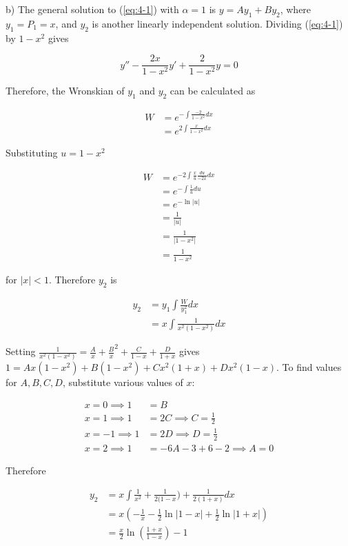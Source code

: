 \documentclass{article}
\begin{document}
\hfill\break
b) The general solution to (\ref{eq:4-1}) with $\alpha = 1$ is $y = Ay_1 + By_2$, where $y_1 = P_1 = x$, and $y_2$ is another linearly
independent solution. Dividing (\ref{eq:4-1}) by $1 - x^2$ gives

\begin{equation} \label{eq:4-3}
    y'' - \frac{2x}{1 - x^2}y' + \frac{2}{1 - x^2}y = 0
\end{equation}

Therefore, the Wronskian of $y_1$ and $y_2$ can be calculated as

\begin{align*}
    W &= e^{-\int \frac{-2}{1 - x^2} dx}\\
    &= e^{2\int \frac{x}{1 - x^2} dx}
\end{align*}

Substituting $u = 1 - x^2$

\begin{align*}
    W &= e^{-2 \int \frac{x}{u} \frac{du}{-2x} dx}\\
    &= e^{- \int \frac{1}{u} du}\\
    &= e^{-\ln|u|}\\
    &= \frac{1}{|u|}\\
    &= \frac{1}{|1 - x^2|}\\
    &= \frac{1}{1 - x^2}
\end{align*}

for $|x| < 1$. Therefore $y_2$ is

\begin{align*}
    y_2 &= y_1 \int \frac{W}{y_1^2}dx\\
    &= x \int \frac{1}{x^2(1 - x^2)} dx
\end{align*}

Setting $\frac{1}{x^2(1 - x^2)} = \frac{A}{x} + \frac{B}x^2 + \frac{C}{1 - x} + \frac{D}{1 + x}$ gives
$1 = Ax(1 - x^2) + B(1 - x^2) + Cx^2(1 + x) + Dx^2(1 - x)$. To find values for $A, B, C, D$, substitute various values of $x$:

\begin{align*}
    x = 0 \implies 1 &= B\\
    x = 1 \implies 1 &= 2C \implies C = \frac{1}{2}\\
    x = -1 \implies 1 &= 2D \implies D = \frac{1}{2}\\
    x = 2 \implies 1 &= -6A - 3 + 6 - 2 \implies A = 0
\end{align*}

Therefore

\begin{align*}
    y_2 &= x \int \frac{1}{x^2} + \frac{1}{2(1 - x}) + \frac{1}{2(1 + x)} dx\\
    &= x \left(-\frac{1}{x} - \frac{1}{2}\ln|1 - x| + \frac{1}{2}\ln|1 + x|\right)\\
    &= \frac{x}{2}\ln\left(\frac{1 + x}{1 - x}\right) - 1
\end{align*}
\end{document}
